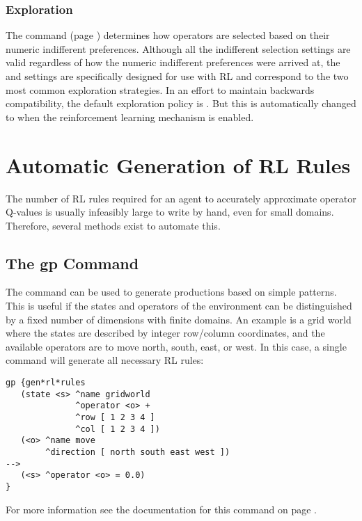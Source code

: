 \subsubsection{Exploration}

The  command (page \pageref{indifferent-selection}) determines how operators are selected based on their numeric indifferent preferences.
Although all the indifferent selection settings are valid regardless of how the numeric indifferent preferences were arrived at, the  and  settings are specifically designed for use with RL and correspond to the two most common exploration strategies.
In an effort to maintain backwards compatibility, the default exploration policy is .
But this is automatically changed to  when the reinforcement learning mechanism is enabled.

\section{Automatic Generation of RL Rules}

The number of RL rules required for an agent to accurately approximate operator Q-values is usually infeasibly large to write by hand, even for small domains.
Therefore, several methods exist to automate this.

\subsection{The gp Command}
The  command can be used to generate productions based on simple patterns.
This is useful if the states and operators of the environment can be distinguished by a fixed number of dimensions with finite domains.
An example is a grid world where the states are described by integer row/column coordinates, and the available operators are to move north, south, east, or west.
In this case, a single  command will generate all necessary RL rules:
	
\begin{verbatim}
gp {gen*rl*rules
   (state <s> ^name gridworld
              ^operator <o> +
              ^row [ 1 2 3 4 ]
              ^col [ 1 2 3 4 ])
   (<o> ^name move
        ^direction [ north south east west ])
-->
   (<s> ^operator <o> = 0.0)
}
\end{verbatim}
	
For more information see the documentation for this command on page \pageref{gp}.

